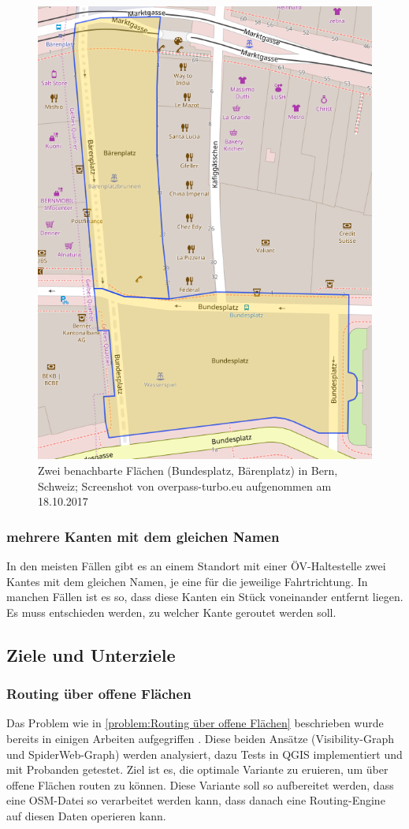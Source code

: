 \begin{figure}[ht]
\centering
\includegraphics[width=0.5\linewidth]{technicalreport/img/bundesplatz_baerenplatz}
\caption[Zwei benachbarte Flächen]{Zwei benachbarte Flächen (Bundesplatz, Bärenplatz) in Bern, Schweiz; Screenshot von overpass-turbo.eu aufgenommen am 18.10.2017}
\label{fig:bundesplatz_baerenplatz}
\end{figure}

\subsubsection{mehrere Kanten mit dem gleichen Namen}
\label{problem:mehrere Kanten mit dem gleichen Namen}
In den meisten Fällen gibt es an einem Standort mit einer ÖV-Haltestelle zwei \glspl{Kante} mit dem gleichen Namen, je eine für die jeweilige Fahrtrichtung. In manchen Fällen ist es so, dass diese Kanten ein Stück voneinander entfernt liegen. Es muss entschieden werden, zu welcher Kante geroutet werden soll.
	
\subsection{Ziele und Unterziele}
\label{Ziele und Unterziele}

\subsubsection{Routing über offene Flächen}
\label{target:Routing über offene Flächen}
Das Problem wie in \ref{problem:Routing über offene Flächen} beschrieben wurde bereits in einigen Arbeiten aufgegriffen \cite{graser_visibility_graph} \cite{dzafic_spider_web_graph}. Diese beiden Ansätze (Visibility-Graph und SpiderWeb-Graph) werden analysiert, dazu Tests in \gls{QGIS} implementiert und mit Probanden getestet. Ziel ist es, die optimale Variante zu eruieren, um über offene Flächen routen zu können. Diese Variante soll so aufbereitet werden, dass eine \ac{OSM}-Datei so verarbeitet werden kann, dass danach eine Routing-Engine auf diesen Daten operieren kann.


